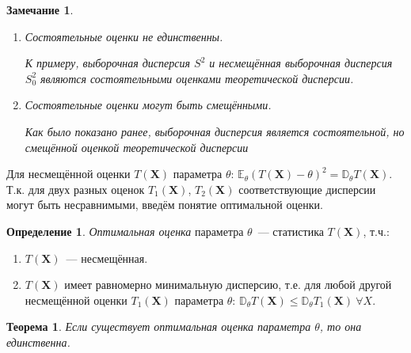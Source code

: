 \documentclass[oneside,final,14pt]{extreport}
\newtheorem{thm}{Теорема}[section]
\newtheorem*{rmrk}{Замечание}
\theoremstyle{definition}
\newtheorem{defn}{Определение}[section]
\begin{document}
\begin{rmrk}
\begin{enumerate}
    \item Состоятельные оценки не единственны.
    
    К примеру, выборочная дисперсия $S^{2}$ и несмещённая выборочная дисперсия $S_0^{2}$ являются состоятельными оценками теоретической дисперсии.
    
    \item Состоятельные оценки могут быть смещёнными.
    
    Как было показано ранее, выборочная дисперсия является состоятельной, но смещённой оценкой теоретической дисперсии
    
    \end{enumerate}
\end{rmrk}

Для несмещённой оценки $T(\mathbf{X})$ параметра $\theta$: $\mathbb{E}_{\theta}(T(\mathbf{X})-\theta)^{2}=\mathbb{D}_{\theta} T(\mathbf{X})$. Т.к. для двух разных оценок $T_1(\mathbf{X})$, $T_2(\mathbf{X})$ соответствующие дисперсии могут быть несравнимыми, введём понятие оптимальной оценки.

\begin{defn}
{\it Оптимальная оценка} параметра $\theta$~--- статистика $T(\mathbf{X})$, т.ч.:
\begin{enumerate}
    \item $T(\mathbf{X})$~--- несмещённая.
    \item $T(\mathbf{X})$ имеет равномерно минимальную дисперсию, т.е. для любой другой несмещённой оценки $T_{1}(\mathbf{X})$ параметра $\theta$: $\mathbb{D}_{\theta} T(\mathbf{X}) \leqslant \mathbb{D}_{\theta} T_{1}(\mathbf{X})~ \forall X$.
\end{enumerate}
\end{defn}
\pagebreak
\begin{thm}
Если существует оптимальная оценка параметра $\theta$, то она единственна.
\end{thm}
\end{document}
